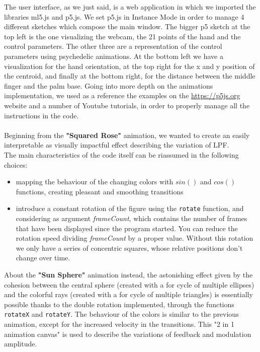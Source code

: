 \documentclass[a4paper,12pt]{report}
\begin{document}
The user interface, as we just said, is a web application in which we imported the libraries ml5.js and p5.js.  We set p5.js in Instance Mode in order to manage 4 different sketches which compose the main window. The bigger p5 sketch at the top left is the one visualizing the webcam, the 21 points of the hand and the control parameters. The other three are a representation of the control parameters using psychedelic animations. At the bottom left we have a visualization for the hand orientation, at the top right for the x and y position of the centroid, and finally at the bottom right, for the distance between the middle finger and the palm base. Going into more depth on the animations implementation, we used as a reference the examples on the \url{https://p5js.org}
website and a number of Youtube tutorials, in order to properly manage all the instructions in the code.\\
\\Beginning from the \textbf{"Squared Rose"} animation, we wanted to create an easily interpretable as visually impactful effect describing the variation of LPF. \\The main characteristics of the code itself can be riassumed in the following choices:\begin{itemize}
\item mapping the behaviour of the changing colors with $sin()$ and $cos()$ functions, creating pleasant and smoothing transitions
\item introduce a constant rotation of the figure using the \texttt{rotate} function, and considering as argument \textit{frameCount}, which contains the number of frames that have been displayed since the program started. You can reduce the rotation speed dividing \textit{frameCount} by a proper value. Without this rotation we only have a series of concentric squares, whose relative positions don't change over time.
\end{itemize}
About the \textbf{"Sun Sphere"} animation instead, the astonishing effect given by the cohesion between the central sphere (created with a for cycle of multiple ellipses) and the colorful rays (created with a for cycle of multiple triangles) is essentially possible thanks to the double rotation implemented, through the functions \texttt{rotateX} and \texttt{rotateY}.
The behaviour of the colors is similar to the previous animation, except for the increased velocity in the transitions. This "2 in 1 animation canvas" is used to describe the variations of feedback and modulation amplitude.\\
\end{document}

